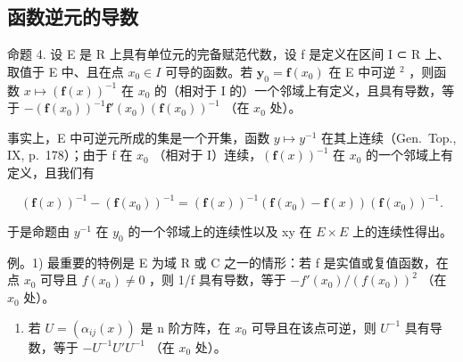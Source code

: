 \subsection{函数逆元的导数}

命题 4. 设 E 是 R 上具有单位元的完备赋范代数，设 f 是定义在区间 I ⊂ R 上、取值于 E 中、且在点 \(x_{0} \in I\) 可导的函数。若 \(\mathbf{y}_{0} = \mathbf{f}(x_{0})\) 在 E 中可逆 \(^{2}\) ，则函数 \(x \mapsto (\mathbf{f}(x))^{-1}\) 在 \(x_{0}\) 的（相对于 I 的）一个邻域上有定义，且具有导数，等于 \(-\left(\mathbf{f}(x_{0})\right)^{-1}\mathbf{f}'(x_{0})\left(\mathbf{f}(x_{0})\right)^{-1}\) （在 \(x_{0}\) 处）。

事实上，E 中可逆元所成的集是一个开集，函数 \(y \mapsto y^{-1}\) 在其上连续（Gen.~Top., IX, p.~178）；由于 f 在 \(x_{0}\) （相对于 I）连续，\(\left(\mathbf{f}(x)\right)^{-1}\) 在 \(x_{0}\) 的一个邻域上有定义，且我们有

\[
\left(\mathbf {f} (x)\right) ^ {- 1} - \left(\mathbf {f} \left(x _ {0}\right)\right) ^ {- 1} = \left(\mathbf {f} (x)\right) ^ {- 1} \left(\mathbf {f} \left(x _ {0}\right) - \mathbf {f} (x)\right) \left(\mathbf {f} \left(x _ {0}\right)\right) ^ {- 1}.
\]

于是命题由 \(y^{-1}\) 在 \(y_{0}\) 的一个邻域上的连续性以及 xy 在 \(E \times E\) 上的连续性得出。

例。1) 最重要的特例是 E 为域 R 或 C 之一的情形：若 f 是实值或复值函数，在点 \(x_{0}\) 可导且 \(f(x_{0}) \neq 0\) ，则 1/f 具有导数，等于 \(-f'(x_{0})/(f(x_{0}))^{2}\) （在 \(x_{0}\) 处）。

\begin{enumerate}
\def\labelenumi{\arabic{enumi})}
\setcounter{enumi}{1}
\tightlist
\item
  若 \(U = (\alpha_{ij}(x))\) 是 n 阶方阵，在 \(x_{0}\) 可导且在该点可逆，则 \(U^{-1}\) 具有导数，等于 \(-U^{-1}U'U^{-1}\) （在 \(x_{0}\) 处）。
\end{enumerate}

